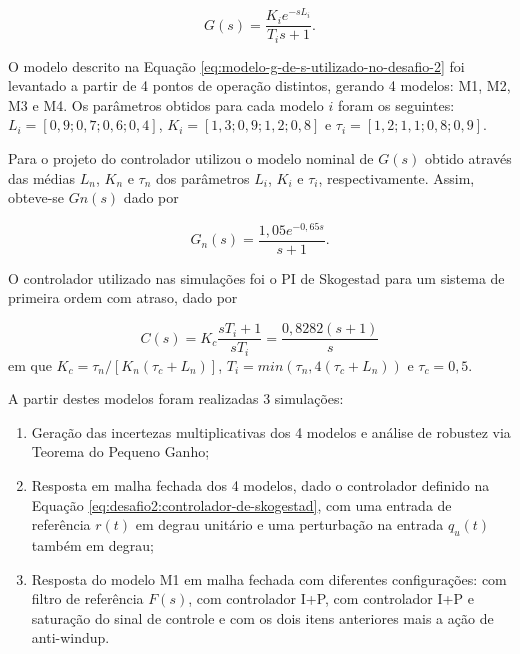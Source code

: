 \begin{equation}
    \label{eq:modelo-g-de-s-utilizado-no-desafio-2}
    G(s) = \frac{K_{i}e^{-sL_{i}}}{T_{i}s + 1}.
\end{equation}

O modelo descrito na Equação \ref{eq:modelo-g-de-s-utilizado-no-desafio-2} foi
levantado a partir de 4 pontos de operação distintos, gerando 4 modelos: M1, M2,
M3 e M4. Os parâmetros obtidos para cada modelo $i$ foram os seguintes: $L_{i} =
[0,9; 0,7; 0,6; 0,4]$, $K_{i} = [1,3; 0,9; 1,2; 0,8]$ e $\tau_{i} = [1,2; 1,1;
0,8; 0,9]$.

Para o projeto do controlador utilizou o modelo nominal de $G(s)$ obtido
através das médias $L_{n}$, $K_{n}$ e $\tau_{n}$ dos parâmetros $L_{i}$, $K_{i}$
e $\tau_{i}$, respectivamente. Assim, obteve-se $G{n}(s)$ dado por

\begin{equation}
    \label{eq:modelo-gn-de-s-utilizado-no-desafio-2}
    G_{n}(s) = \frac{1,05e^{-0,65s}}{s + 1}.
\end{equation}

O controlador utilizado nas simulações foi o PI de Skogestad para um sistema de
primeira ordem com atraso, dado por

\begin{equation}
    \label{eq:desafio2:controlador-de-skogestad}
    C(s) = K_{c}\frac{sT_{i} + 1}{sT_{i}} = \frac{0,8282(s + 1)}{s}
\end{equation}
em que $K_{c} = \tau_{n}/[K_{n}(\tau_{c} + L_{n})]$, $T_{i} = min(\tau_{n},
4(\tau_{c} + L_{n}))$ e $\tau_{c} = 0,5$. 

A partir destes modelos foram realizadas 3 simulações:
\begin{enumerate}
    \item Geração das incertezas multiplicativas dos 4 modelos e análise de
    robustez via Teorema do Pequeno Ganho;
    \item Resposta em malha fechada dos 4 modelos, dado o controlador definido
    na Equação \ref{eq:desafio2:controlador-de-skogestad}, com uma entrada de
    referência $r(t)$ em degrau unitário e uma perturbação na entrada $q_{u}(t)$
    também em degrau;
    \item Resposta do modelo M1 em malha fechada com diferentes configurações:
    com filtro de referência $F(s)$, com controlador I+P, com controlador I+P e
    saturação do sinal de controle e com os dois itens anteriores mais a ação de
    anti-windup.
\end{enumerate}

